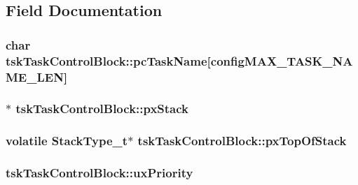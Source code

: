 \subsection{Field Documentation}
\hypertarget{structtskTaskControlBlock_a67d61291794f38afb5be5132078bc24f}{
\subsubsection[{pc\-Task\-Name}]{\setlength{\rightskip}{0pt plus 5cm}char tsk\-Task\-Control\-Block\-::pc\-Task\-Name\mbox{[}{\bf config\-M\-A\-X\-\_\-\-T\-A\-S\-K\-\_\-\-N\-A\-M\-E\-\_\-\-L\-E\-N}\mbox{]}}}\label{structtskTaskControlBlock_a67d61291794f38afb5be5132078bc24f}
\hypertarget{structtskTaskControlBlock_a9a0d71a9f95dd0609f9911d9efd79134}{
\subsubsection[{px\-Stack}]{$\ast$ tsk\-Task\-Control\-Block\-::px\-Stack}}\label{structtskTaskControlBlock_a9a0d71a9f95dd0609f9911d9efd79134}
\hypertarget{structtskTaskControlBlock_a429a186c7f8e34aba1eef5e12d215b90}{
\subsubsection[{px\-Top\-Of\-Stack}]{\setlength{\rightskip}{0pt plus 5cm}volatile {\bf Stack\-Type\-\_\-t}$\ast$ tsk\-Task\-Control\-Block\-::px\-Top\-Of\-Stack}}\label{structtskTaskControlBlock_a429a186c7f8e34aba1eef5e12d215b90}
\hypertarget{structtskTaskControlBlock_a79187811e3d2a15595942e3b44237d85}{
\subsubsection[{ux\-Priority}]{ tsk\-Task\-Control\-Block\-::ux\-Priority}}\label{structtskTaskControlBlock_a79187811e3d2a15595942e3b44237d85}
